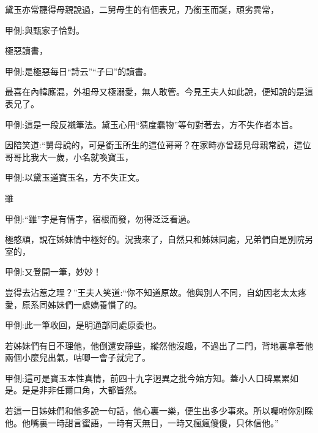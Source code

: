 \begin{parag}
    黛玉亦常聽得母親說過，二舅母生的有個表兄，乃銜玉而誕，頑劣異常，\begin{note}甲側:與甄家子恰對。\end{note}極惡讀書，\begin{note}甲側:是極惡每日“詩云”“子曰”的讀書。\end{note}最喜在內幃廝混，外祖母又極溺愛，無人敢管。今見王夫人如此說，便知說的是這表兄了。\begin{note}甲側:這是一段反襯筆法。黛玉心用“猜度蠢物”等句對著去，方不失作者本旨。\end{note}因陪笑道:“舅母說的，可是銜玉所生的這位哥哥？在家時亦曾聽見母親常說，這位哥哥比我大一歲，小名就喚寶玉，\begin{note}甲側:以黛玉道寶玉名，方不失正文。\end{note}雖\begin{note}甲側:“雖”字是有情字，宿根而發，勿得泛泛看過。\end{note}極憨頑，說在姊妹情中極好的。況我來了，自然只和姊妹同處，兄弟們自是別院另室的，\begin{note}甲側:又登開一筆，妙妙！\end{note}豈得去沾惹之理？”王夫人笑道:“你不知道原故。他與別人不同，自幼因老太太疼愛，原系同姊妹們一處嬌養慣了的。\begin{note}甲側:此一筆收回，是明通部同處原委也。\end{note}若姊妹們有日不理他，他倒還安靜些，縱然他沒趣，不過出了二門，背地裏拿著他兩個小麼兒出氣，咕唧一會子就完了。\begin{note}甲側:這可是寶玉本性真情，前四十九字迥異之批今始方知。蓋小人口碑累累如是。是是非非任爾口角，大都皆然。\end{note}若這一日姊妹們和他多說一句話，他心裏一樂，便生出多少事來。所以囑咐你別睬他。他嘴裏一時甜言蜜語，一時有天無日，一時又瘋瘋傻傻，只休信他。”
\end{parag}


